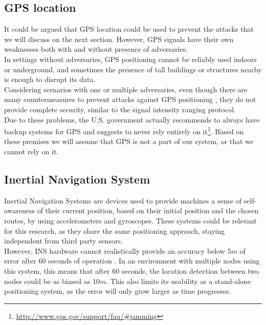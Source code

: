 \documentclass{article}
\begin{document}
\subsection{GPS location}

It could be argued that GPS location could be used to prevent the attacks that we will discuss on the next section. However, GPS signals have their own weaknesses both with and without presence of adversaries.\\

In settings without adversaries, GPS positioning cannot be reliably used indoors or underground, and sometimes the presence of tall buildings or structures nearby is enough to disrupt its data.\\

Considering scenarios with one or multiple adversaries, even though there are many countermeasures to prevent attacks against GPS positioning \cite{jafarnia2012gps, warner2003gps, wen2005countermeasures}, they do not provide complete security, similar to the signal intensity ranging protocol.\\

Due to these problems, the U.S. government actually recommends to always have backup systems for GPS and suggests to never rely entirely on it\footnote{\url{http://www.gps.gov/support/faq/#jamming}}. Based on these premises we will assume that GPS is not a part of our system, or that we cannot rely on it.\\

\subsection{Inertial Navigation System}

Inertial Navigation Systems are devices used to provide machines a sense of self-awareness of their current position, based on their initial position and the chosen routes, by using accelerometers and gyroscopes. These systems could be relevant for this research, as they share the same positioning approach, staying independent from third party sensors.\\

However, INS hardware cannot realistically provide an accuracy below $5m$ of error after $60$ seconds of operation \cite{woodman2007introduction}. In an environment with multiple nodes using this system, this means that after $60$ seconds, the location detection between two nodes could be as biased as $10m$. This also limits its usability as a stand-alone positioning system, as the error will only grow larger as time progresses.\\
\end{document}

